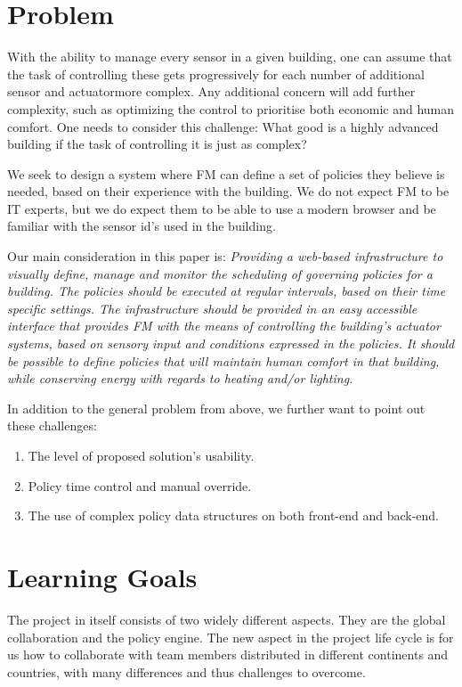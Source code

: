 \section{Problem} \label{sec:problem}
With the ability to manage every sensor in a given building, one can assume that the task of controlling these gets progressively \textemdash for each number of additional sensor and actuator\textemdash more complex. Any additional concern will add further complexity, such as optimizing the control to prioritise both economic and human comfort. One needs to consider this challenge: What good is a highly advanced building if the task of controlling it is just as complex?

We seek to design a system where FM can define a set of policies they believe is needed, based on their experience with the building. We do not expect FM to be IT experts, but we do expect them to be able to use a modern browser and be familiar with the sensor id's used in the building.

Our main consideration in this paper is: \textit{Providing a web-based infrastructure to visually define, manage and monitor the scheduling of governing policies for a building. The policies should be executed at regular intervals, based on their time specific settings. The infrastructure should be provided in an easy accessible interface that provides FM with the means of controlling the building's actuator systems, based on sensory input and conditions expressed in the policies. It should be possible to define policies that will maintain human comfort in that building, while conserving energy with regards to heating and/or lighting.}

In addition to the general problem from above, we further want to point out these challenges:
\begin{enumerate}
	\item The level of proposed solution's usability.
	\item Policy time control and manual override.
	\item The use of complex policy data structures on both front-end and back-end.
\end{enumerate}

\section{Learning Goals} \label{sec:learninggoals}
The project in itself consists of two widely different aspects. They are the global collaboration and the policy engine. The new aspect in the project life cycle is for us how to collaborate with team members distributed in different continents and countries, with many differences and thus challenges to overcome.

